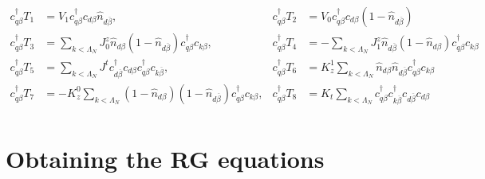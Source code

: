 \documentclass[twoside,11pt]{report}
\numberwithin{equation}{section}
\begin{document}
\begin{equation}\begin{aligned}
	c^\dagger_{q\beta}T_1 &= V_1 c^\dagger_{q\beta}c_{d\beta}\hat n_{d\overline\beta}, &c^\dagger_{q\beta}T_2 &= V_0 c^\dagger_{q\beta}c_{d\beta}\left(1 - \hat n_{d\overline\beta}\right)\\
	c^\dagger_{q\beta}T_3 &= \sum_{k<\Lambda_N}J^z_0 \hat n_{d\beta}\left(1 - \hat n_{d\overline\beta}\right) c^\dagger_{q\beta}c_{k\beta}, &c^\dagger_{q\beta}T_4 &= -\sum_{k<\Lambda_N}J^z_1 \hat n_{d\overline\beta}\left(1 - \hat n_{d\beta}\right) c^\dagger_{q\beta}c_{k\beta}\\
	c^\dagger_{q\beta}T_5 &= \sum_{k<\Lambda_N}J^t c^\dagger_{d\overline\beta}c_{d\beta}c^\dagger_{q\beta}c_{k\overline\beta}, &c^\dagger_{q\beta}T_6 &= K_z^1 \sum_{k<\Lambda_N}\hat n_{d\beta}\hat n_{d\overline\beta}c^\dagger_{q\beta}c_{k\beta}\\
	c^\dagger_{q\beta}T_7 &= -K_z^0 \sum_{k<\Lambda_N}\left(1 - \hat n_{d\beta}\right)\left(1 - \hat n_{d\overline\beta}\right)c^\dagger_{q\beta}c_{k\beta}, &c^\dagger_{q\beta}T_8 &= K_t \sum_{k<\Lambda_N}c^\dagger_{q\beta}c^\dagger_{k\overline\beta}c_{d\overline\beta}c_{d\beta}\\
\end{aligned}\end{equation}

\section{Obtaining the RG equations}
\end{document}

